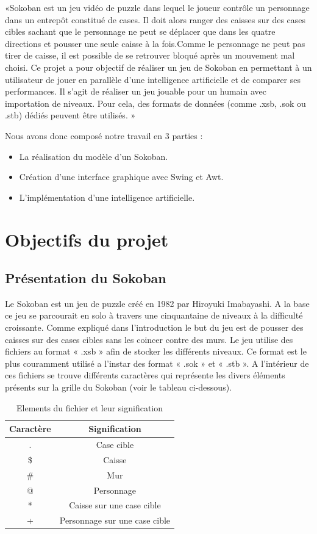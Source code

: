 \documentclass[a4paper,12pt]{article} %
\begin{document}
«Sokoban est un jeu vidéo de puzzle dans lequel le joueur contrôle un personnage dans un entrepôt constitué de cases. Il doit alors ranger des caisses sur des cases cibles sachant que le personnage ne peut se déplacer que dans les quatre directions et pousser une seule caisse à la fois.Comme le personnage ne peut pas tirer de caisse, il est possible de se retrouver bloqué après un mouvement mal choisi. Ce projet a pour objectif de réaliser un jeu de Sokoban en permettant à un utilisateur de jouer en parallèle d'une intelligence artificielle et de comparer ses performances. Il s'agit de réaliser un jeu jouable pour un humain avec importation de niveaux. Pour cela, des formats de données (comme .xsb, .sok ou .stb) dédiés peuvent être utilisés. »

Nous avons donc composé notre travail en 3 parties :
\begin{itemize}
\item La réalisation du modèle d’un Sokoban.
\item Création d’une interface graphique avec Swing et Awt.
\item L’implémentation d’une intelligence artificielle.
\end{itemize}
\newpage
\section{Objectifs du projet}

\subsection{Présentation du Sokoban}
Le Sokoban est un jeu de puzzle créé en 1982 par Hiroyuki Imabayashi. A la base ce jeu se parcourait en solo à travers une cinquantaine de niveaux à la difficulté croissante.
Comme expliqué dans l’introduction le but du jeu est de pousser des caisses sur des cases cibles sans les coincer contre des murs.
Le jeu utilise des fichiers au format « .xsb » afin de stocker les différents niveaux. Ce format est le plus couramment utilisé a l’instar des format « .sok » et « .stb ». A l’intérieur de ces fichiers se trouve différents caractères qui représente les divers éléments présents sur la grille du Sokoban (voir le tableau ci-dessous).
\begin{table}[h]
\begin{center}
\begin{tabular}{|c|c|}
\hline
Caractère &
Signification \\
\hline
. &
Case cible\\
\hline
\$ &
Caisse \\
\hline
\# &
Mur \\
\hline
@ &
Personnage \\
\hline
* & 
Caisse sur une case cible \\
\hline
+ &
Personnage sur une case cible \\
\hline
\end{tabular}
\end{center}
\caption{Elements du fichier et leur signification}
\end{table}
\end{document}
